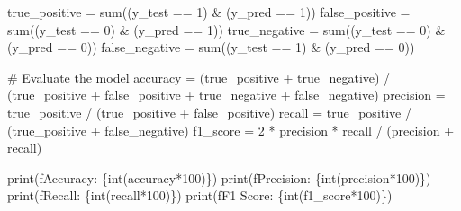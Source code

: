 \documentclass[
  letterpaper,
  DIV=11,
  numbers=noendperiod]{scrreprt}
\newenvironment{Shaded}{\begin{snugshade}}{\end{snugshade}}
\newcommand{\BuiltInTok}[1]{\textcolor[rgb]{0.00,0.23,0.31}{#1}}
\newcommand{\CommentTok}[1]{\textcolor[rgb]{0.37,0.37,0.37}{#1}}
\newcommand{\DecValTok}[1]{\textcolor[rgb]{0.68,0.00,0.00}{#1}}
\newcommand{\NormalTok}[1]{\textcolor[rgb]{0.00,0.23,0.31}{#1}}
\newcommand{\OperatorTok}[1]{\textcolor[rgb]{0.37,0.37,0.37}{#1}}
\newcommand{\SpecialCharTok}[1]{\textcolor[rgb]{0.37,0.37,0.37}{#1}}
\newcommand{\SpecialStringTok}[1]{\textcolor[rgb]{0.13,0.47,0.30}{#1}}
\begin{document}
\begin{Shaded}
\begin{Highlighting}[]
\NormalTok{true\_positive }\OperatorTok{=} \BuiltInTok{sum}\NormalTok{((y\_test }\OperatorTok{==} \DecValTok{1}\NormalTok{) }\OperatorTok{\&}\NormalTok{ (y\_pred }\OperatorTok{==} \DecValTok{1}\NormalTok{))}
\NormalTok{false\_positive }\OperatorTok{=} \BuiltInTok{sum}\NormalTok{((y\_test }\OperatorTok{==} \DecValTok{0}\NormalTok{) }\OperatorTok{\&}\NormalTok{ (y\_pred }\OperatorTok{==} \DecValTok{1}\NormalTok{))}
\NormalTok{true\_negative }\OperatorTok{=} \BuiltInTok{sum}\NormalTok{((y\_test }\OperatorTok{==} \DecValTok{0}\NormalTok{) }\OperatorTok{\&}\NormalTok{ (y\_pred }\OperatorTok{==} \DecValTok{0}\NormalTok{))}
\NormalTok{false\_negative }\OperatorTok{=} \BuiltInTok{sum}\NormalTok{((y\_test }\OperatorTok{==} \DecValTok{1}\NormalTok{) }\OperatorTok{\&}\NormalTok{ (y\_pred }\OperatorTok{==} \DecValTok{0}\NormalTok{))}

\CommentTok{\# Evaluate the model}
\NormalTok{accuracy }\OperatorTok{=}\NormalTok{ (true\_positive }\OperatorTok{+}\NormalTok{ true\_negative) }\OperatorTok{/}\NormalTok{ (true\_positive }\OperatorTok{+}\NormalTok{ false\_positive }\OperatorTok{+}\NormalTok{ true\_negative }\OperatorTok{+}\NormalTok{ false\_negative)}
\NormalTok{precision }\OperatorTok{=}\NormalTok{ true\_positive }\OperatorTok{/}\NormalTok{ (true\_positive }\OperatorTok{+}\NormalTok{ false\_positive)}
\NormalTok{recall }\OperatorTok{=}\NormalTok{ true\_positive }\OperatorTok{/}\NormalTok{ (true\_positive }\OperatorTok{+}\NormalTok{ false\_negative)}
\NormalTok{f1\_score }\OperatorTok{=} \DecValTok{2} \OperatorTok{*}\NormalTok{ precision }\OperatorTok{*}\NormalTok{ recall }\OperatorTok{/}\NormalTok{ (precision }\OperatorTok{+}\NormalTok{ recall)}

\BuiltInTok{print}\NormalTok{(}\SpecialStringTok{f\textquotesingle{}Accuracy: }\SpecialCharTok{\{}\BuiltInTok{int}\NormalTok{(accuracy}\OperatorTok{*}\DecValTok{100}\NormalTok{)}\SpecialCharTok{\}}\SpecialStringTok{\textquotesingle{}}\NormalTok{)}
\BuiltInTok{print}\NormalTok{(}\SpecialStringTok{f\textquotesingle{}Precision: }\SpecialCharTok{\{}\BuiltInTok{int}\NormalTok{(precision}\OperatorTok{*}\DecValTok{100}\NormalTok{)}\SpecialCharTok{\}}\SpecialStringTok{\textquotesingle{}}\NormalTok{)}
\BuiltInTok{print}\NormalTok{(}\SpecialStringTok{f\textquotesingle{}Recall: }\SpecialCharTok{\{}\BuiltInTok{int}\NormalTok{(recall}\OperatorTok{*}\DecValTok{100}\NormalTok{)}\SpecialCharTok{\}}\SpecialStringTok{\textquotesingle{}}\NormalTok{)}
\BuiltInTok{print}\NormalTok{(}\SpecialStringTok{f\textquotesingle{}F1 Score: }\SpecialCharTok{\{}\BuiltInTok{int}\NormalTok{(f1\_score}\OperatorTok{*}\DecValTok{100}\NormalTok{)}\SpecialCharTok{\}}\SpecialStringTok{\textquotesingle{}}\NormalTok{)}


\end{Highlighting}
\end{Shaded}
\end{document}
